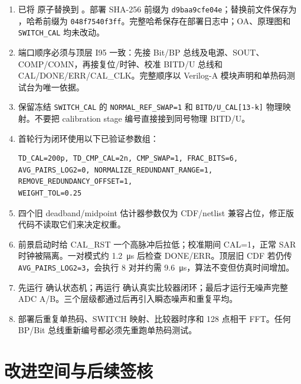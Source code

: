 \documentclass[UTF8,a4paper,11pt]{ctexart}
\newcommand{\code}[1]{\texttt{#1}}
\begin{document}
\begin{enumerate}
  \item 已将  原子替换到 。部署 SHA-256 前缀为 \code{d9baa9cfe04e}；替换前文件保存为 ，哈希前缀为 \code{048f7540f3ff}。完整哈希保存在部署日志中；OA、原理图和 \code{SWITCH\_CAL} 均未改动。
  \item 端口顺序必须与顶层 I95 一致：先接 Bit/BP 总线及电源、SOUT、COMP/COMN，再接复位/时钟、校准 BITD/U 总线和 CAL/DONE/ERR/CAL\_CLK。完整顺序以 Verilog-A 模块声明和单热码测试台为唯一依据。
  \item 保留冻结 \code{SWITCH\_CAL} 的 \code{NORMAL\_REF\_SWAP=1} 和 \code{BITD/U\_CAL[13-k]} 物理映射。不要把 calibration stage 编号直接接到同号物理 BITD/U。
  \item 首轮行为闭环使用以下已验证参数组：
\begin{lstlisting}[basicstyle=\ttfamily\footnotesize,breaklines=true]
TD_CAL=200p, TD_CMP_CAL=2n, CMP_SWAP=1, FRAC_BITS=6,
AVG_PAIRS_LOG2=0, NORMALIZE_REDUNDANT_RANGE=1,
REMOVE_REDUNDANCY_OFFSET=1,
WEIGHT_TOL=0.25
\end{lstlisting}
  \item 四个旧 deadband/midpoint 估计器参数仅为 CDF/netlist 兼容占位，修正版代码不读取它们来决定权重。
  \item 前景启动时给 CAL\_RST 一个高脉冲后拉低；校准期间 CAL=1，正常 SAR 时钟被隔离。一对模式约 \SI{1.2}{\micro s} 后检查 DONE/ERR。顶层旧 CDF 若仍传 \code{AVG\_PAIRS\_LOG2=3}，会执行 8 对并约需 \SI{9.6}{\micro s}，算法不变但仿真时间增加。
  \item 先运行  确认状态机；再运行  确认真实比较器闭环；最后才运行无噪声完整 ADC A/B。三个层级都通过后再引入瞬态噪声和重复平均。
  \item 部署后重复单热码、SWITCH 映射、比较器时序和 128 点相干 FFT。任何 BP/Bit 总线重新编号都必须先重跑单热码测试。
\end{enumerate}

\section{改进空间与后续签核}
\end{document}
